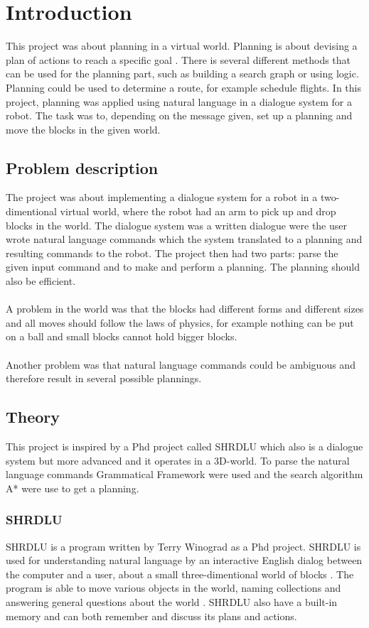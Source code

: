 \chapter{Introduction}
This project was about planning in a virtual world. Planning is about devising a plan of actions to reach a specific goal \citep{planning_ai}. There is several different methods that can be used for the planning part, such as building a search graph or using logic. 
Planning could be used to determine a route, for example schedule flights. In this project, planning was applied using natural language in a dialogue system for a robot. The task was to, depending on the message given, set up a planning and move the blocks in the given world.

\section{Problem description}
The project was about implementing a dialogue system for a robot in a two-dimentional virtual world, where the robot had an arm to pick up and drop blocks in the world. The dialogue system was a written dialogue were the user wrote natural language commands which the system translated to a planning and resulting commands to the robot. The project then had two parts: parse the given input command and to make and perform a planning. The planning should also be efficient. \\\\
A problem in the world was that the blocks had different forms and different sizes and all moves should follow the laws of physics, for example nothing can be put on a ball and small blocks cannot hold bigger blocks. \\\\
Another problem was that natural language commands could be ambiguous and therefore result in several possible plannings.

\section{Theory}
This project is inspired by a Phd project called SHRDLU which also is a dialogue system but more advanced and it operates in a 3D-world. To parse the natural language commands Grammatical Framework were used and the search algorithm A* were use to get a planning. 

\subsection{SHRDLU}
SHRDLU is a program written by Terry Winograd as a Phd project. SHRDLU is used for understanding natural language by an interactive English dialog between the computer and a user, about a small three-dimentional world of blocks \citep{SHRDLU_url}. The program is able to move various objects in the world, naming collections and answering general questions about the world \citep{SHRDLU_url}. SHRDLU also have a built-in memory and can both remember and discuss its plans and actions.

